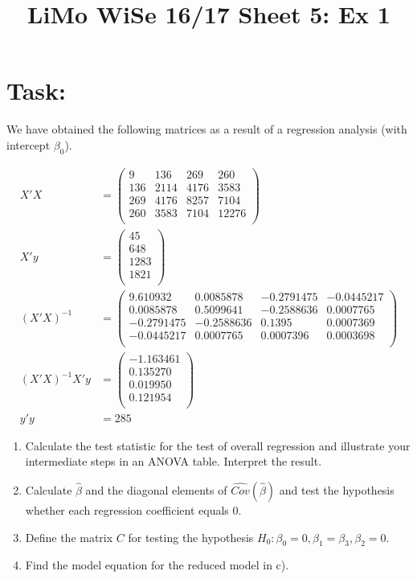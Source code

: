 \documentclass[]{article}
\title{LiMo WiSe 16/17 Sheet 5: Ex 1}
\author{}
\date{}
\begin{document}
\maketitle

\section{Task:}\label{task}

We have obtained the following matrices as a result of a regression
analysis (with intercept \(\beta_0\)).

\[
\begin{aligned}
X'X &= 
\begin{pmatrix}
9   & 136  & 269  & 260  \\
136 & 2114 & 4176 & 3583\\
269 & 4176 & 8257 & 7104\\
260 & 3583 & 7104 & 12276\\
\end{pmatrix} \\
X'y &=
\begin{pmatrix}
45 \\
648 \\
1283 \\
1821 \\
\end{pmatrix} \\
(X'X)^{-1} &= 
\begin{pmatrix}
9.610932  & 0.0085878  & -0.2791475  & -0.0445217\\
0.0085878 & 0.5099641  & -0.2588636  & 0.0007765\\
-0.2791475 & -0.2588636 &  0.1395     & 0.0007369\\
-0.0445217 & 0.0007765  &  0.0007396  & 0.0003698\\
\end{pmatrix}\\
(X'X)^{-1}X'y &=
\begin{pmatrix}
-1.163461\\
0.135270\\
0.019950\\
0.121954\\
\end{pmatrix}\\
y'y &= 285
\end{aligned}
\]

\begin{enumerate}
\def\labelenumi{\alph{enumi}.}
\item
  Calculate the test statistic for the test of overall regression and
  illustrate your intermediate steps in an ANOVA table. Interpret the
  result.
\item
  Calculate \(\hat{\beta}\) and the diagonal elements of
  \(\widehat{Cov}(\hat{\beta})\) and test the hypothesis whether each
  regression coefficient equals 0.
\item
  Define the matrix \(C\) for testing the hypothesis
  \(H_0 : \beta_0 = 0, \beta_1 = \beta_3, \beta_2 = 0\).
\item
  Find the model equation for the reduced model in c).
\end{enumerate}
\end{document}
